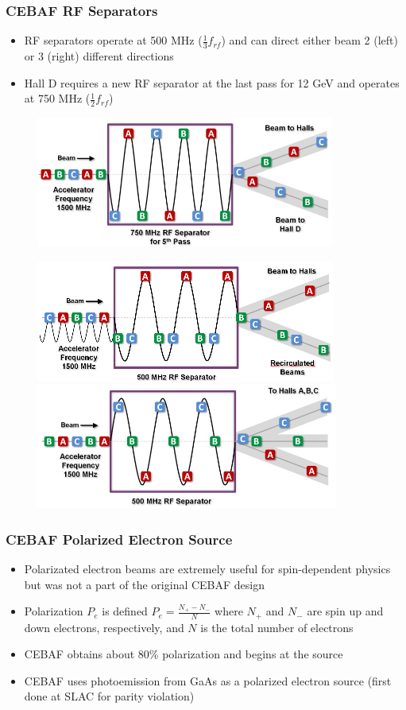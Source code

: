 \documentclass{beamer}
\begin{document}

\begin{frame}
\frametitle{CEBAF RF Separators}
\begin{itemize}
\item RF separators operate at 500 MHz ($\frac{1}{3} f_{rf}$) and can direct either beam 2 (left) or 3 (right) different directions
\item Hall D requires a new RF separator at the last pass for 12 GeV and operates at 750 MHz ($\frac{1}{2} f_{rf}$)
\end{itemize}
\begin{figure}
\includegraphics[width=0.35\linewidth]{figs/500MHz_rf_separator.png}
\end{figure}
\begin{figure}
\includegraphics[width=0.50\linewidth]{figs/beam_separator3.png}
\includegraphics[width=0.50\linewidth]{figs/beam_separator4.png}
\end{figure}

\end{frame}


\begin{frame}
\frametitle{CEBAF Polarized Electron Source}
\begin{itemize}
\item Polarizated electron beams are extremely useful for spin-dependent physics but was not a part of the original CEBAF design
\item Polarization $P_e$ is defined $P_e=\frac{N_+-N_-}{N}$ where $N_+$ and $N_-$ are spin up and down electrons, respectively, and $N$ is the total number of electrons
\item CEBAF obtains about 80\% polarization and begins at the source
\item CEBAF uses photoemission from GaAs as a polarized electron source (first done at SLAC for parity violation)
\end{itemize}

\end{frame}
\end{document}
